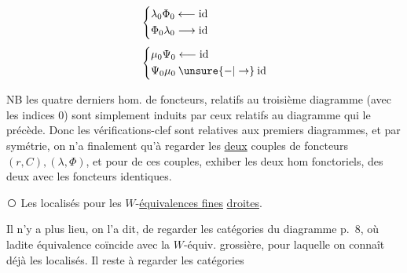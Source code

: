 \noindent\begin{minipage}{.62\linewidth}\small
{}
\end{minipage}\hfill\begin{minipage}{.36\linewidth}\small
\[
 \begin{aligned}
 &\left\{\begin{aligned}\lambda_0\Phi_0&\longleftarrow\mathrm{id}\\\Phi_0\lambda_0&\longrightarrow\mathrm{id}\end{aligned}\right.\\[3pt]
 &\left\{\begin{aligned}\mu_0\Psi_0&\longleftarrow\mathrm{id}\\\Psi_0\mu_0&\mathbin{\unsure{-|\to}}\mathrm{id}\end{aligned}\right.
 \end{aligned}
\]
\end{minipage}\par


NB les quatre derniers hom. de foncteurs, relatifs au troisième diagramme (avec les indices 0) sont simplement induits par ceux relatifs au diagramme qui le précède. Donc les vérifications-clef sont relatives aux  premiers diagrammes, et par symétrie, on n'a finalement qu'à regarder les \uline{deux} couples de foncteurs $(r,C),(\lambda,\Phi)$, et pour  de ces couples, exhiber les deux hom fonctoriels, des deux  avec les foncteurs identiques.


\textcircled{\scriptsize{}} Les localisés pour les $W$-\uline{équivalences fines} \uline{droites}.

Il n'y a plus lieu, on l'a dit, de regarder les catégories  du diagramme p.~8, où ladite équivalence coïncide avec la $W$-équiv. grossière, pour laquelle on connaît déjà les localisés. Il reste à regarder les catégories

